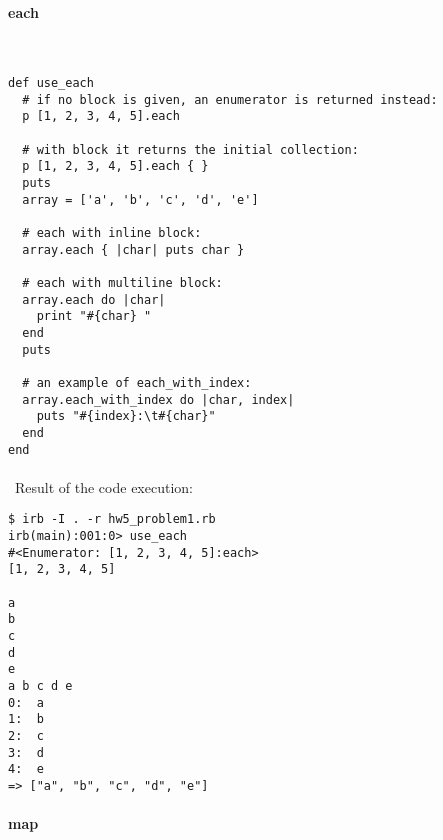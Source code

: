 \documentclass{article}
\begin{document}
\paragraph{}\
\paragraph{}\
\paragraph{}\
\paragraph{}\




\paragraph{ each}\

\begin{verbatim}
def use_each
  # if no block is given, an enumerator is returned instead:
  p [1, 2, 3, 4, 5].each

  # with block it returns the initial collection:
  p [1, 2, 3, 4, 5].each { }
  puts
  array = ['a', 'b', 'c', 'd', 'e']

  # each with inline block:
  array.each { |char| puts char }

  # each with multiline block:
  array.each do |char|
    print "#{char} "
  end
  puts

  # an example of each_with_index:
  array.each_with_index do |char, index|
    puts "#{index}:\t#{char}"
  end
end
\end{verbatim}


\paragraph{}\
Result of the code execution:

\begin{verbatim} 
$ irb -I . -r hw5_problem1.rb
irb(main):001:0> use_each
#<Enumerator: [1, 2, 3, 4, 5]:each>
[1, 2, 3, 4, 5]

a
b
c
d
e
a b c d e
0:	a
1:	b
2:	c
3:	d
4:	e
=> ["a", "b", "c", "d", "e"]
\end{verbatim}



\paragraph{ map}\
\end{document}
